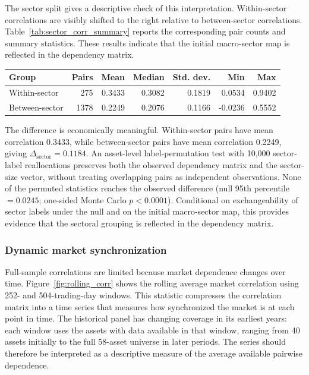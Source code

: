 The sector split gives a descriptive check of this interpretation. Within-sector correlations are visibly shifted to the right relative to between-sector correlations. Table~\ref{tab:sector_corr_summary} reports the corresponding pair counts and summary statistics. These results indicate that the initial macro-sector map is reflected in the dependency matrix.

\begin{center}
\label{tab:sector_corr_summary}
\begin{tabular}{lrrrrrr}
\toprule
Group & Pairs & Mean & Median & Std. dev. & Min & Max \\
\midrule
Within-sector & 275 & 0.3433 & 0.3082 & 0.1819 & 0.0534 & 0.9402 \\
Between-sector & 1378 & 0.2249 & 0.2076 & 0.1166 & -0.0236 & 0.5552 \\
\bottomrule
\end{tabular}
\end{center}

The difference is economically meaningful. Within-sector pairs have mean correlation 0.3433, while between-sector pairs have mean correlation 0.2249, giving $\Delta_{\mathrm{sector}}=0.1184$. An asset-level label-permutation test with 10,000 sector-label reallocations preserves both the observed dependency matrix and the sector-size vector, without treating overlapping pairs as independent observations. None of the permuted statistics reaches the observed difference (null 95th percentile $=0.0245$; one-sided Monte Carlo $p<0.0001$). Conditional on exchangeability of sector labels under the null and on the initial macro-sector map, this provides evidence that the sectoral grouping is reflected in the dependency matrix.

\subsubsection{Dynamic market synchronization}

Full-sample correlations are limited because market dependence changes over time. Figure~\ref{fig:rolling_corr} shows the rolling average market correlation using 252- and 504-trading-day windows. This statistic compresses the correlation matrix into a time series that measures how synchronized the market is at each point in time. The historical panel has changing coverage in its earliest years: each window uses the assets with data available in that window, ranging from 40 assets initially to the full 58-asset universe in later periods. The series should therefore be interpreted as a descriptive measure of the average available pairwise dependence.

